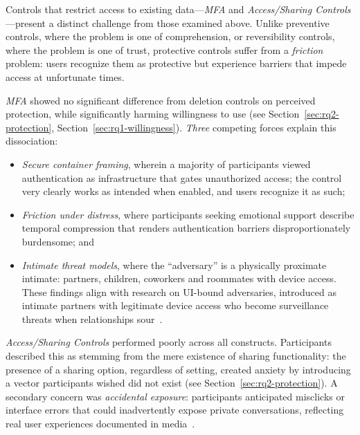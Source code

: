 \documentclass[letterpaper,twocolumn,10pt]{article}
\begin{document}
Controls that restrict access to existing data---\emph{MFA} and \emph{Access/Sharing Controls}---present a distinct challenge from those examined above. Unlike preventive controls, where the problem is one of comprehension, or reversibility controls, where the problem is one of trust, protective controls suffer from a \textit{friction} problem: users recognize them as protective but experience barriers that impede access at unfortunate times.

 \emph{MFA} showed no significant difference from deletion controls  on perceived protection, while significantly harming willingness to use (see Section~\ref{sec:rq2-protection}, Section~\ref{sec:rq1-willingness}). \textit{Three} competing forces explain this dissociation: 
\begin{itemize}
    \item \textit{Secure container framing}, wherein a majority of participants viewed authentication as infrastructure that gates unauthorized access; the control very clearly works as intended when enabled, and users recognize it as such;
    \item \textit{Friction under distress}, where participants seeking emotional support describe temporal compression that renders authentication barriers disproportionately burdensome; and
    \item \textit{Intimate threat models}, where the ``adversary'' is a physically proximate intimate: partners, children, coworkers and roommates with device access. These findings align with research on UI-bound adversaries, introduced as intimate partners with legitimate device access who become surveillance threats when relationships sour~\cite{freed2018stalker, tseng2020tools}. 
\end{itemize} 

 \emph{Access/Sharing Controls} performed poorly across all constructs. Participants described this as stemming from the mere existence of sharing functionality: the presence of a sharing option, regardless of setting, created anxiety by introducing a vector participants wished did not exist (see Section~\ref{sec:rq2-protection}). A secondary concern was \textit{accidental exposure}: participants anticipated misclicks or interface errors that could inadvertently expose private conversations, reflecting real user experiences documented in media~\cite{pcmag2025metaAI}.
\end{document}
